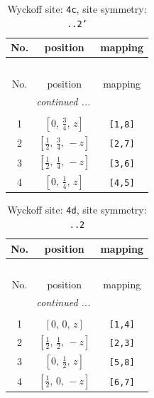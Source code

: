 \documentclass[fleqn,8pt]{jsarticle}
\begin{document}
\renewcommand{\arraystretch}{1.2}
\begin{longtable}{ccc}
\caption{Wyckoff site: {\tt 4c}, site symmetry: {\tt ..2'}}
 \\
 \hline \hline
No. & position & mapping \\ \hline \endfirsthead

\multicolumn{2}{l}{\tablename\ \thetable{}} \\
 \hline \hline
No. & position & mapping \\ \hline \endhead

 \hline \hline
\multicolumn{2}{r}{\footnotesize\it continued ...} \\ \endfoot

 \hline \hline
\multicolumn{2}{r}{} \\ \endlastfoot

1 & $\left[ 0,\, \frac{3}{4},\, z \right]$ & {\tt [1,8]} \\ \hline
2 & $\left[ \frac{1}{2},\, \frac{3}{4},\, - z \right]$ & {\tt [2,7]} \\ \hline
3 & $\left[ \frac{1}{2},\, \frac{1}{4},\, - z \right]$ & {\tt [3,6]} \\ \hline
4 & $\left[ 0,\, \frac{1}{4},\, z \right]$ & {\tt [4,5]} \\
\end{longtable}
\renewcommand{\arraystretch}{1.2}
\begin{longtable}{ccc}
\caption{Wyckoff site: {\tt 4d}, site symmetry: {\tt ..2}}
 \\
 \hline \hline
No. & position & mapping \\ \hline \endfirsthead

\multicolumn{2}{l}{\tablename\ \thetable{}} \\
 \hline \hline
No. & position & mapping \\ \hline \endhead

 \hline \hline
\multicolumn{2}{r}{\footnotesize\it continued ...} \\ \endfoot

 \hline \hline
\multicolumn{2}{r}{} \\ \endlastfoot

1 & $\left[ 0,\, 0,\, z \right]$ & {\tt [1,4]} \\ \hline
2 & $\left[ \frac{1}{2},\, \frac{1}{2},\, - z \right]$ & {\tt [2,3]} \\ \hline
3 & $\left[ 0,\, \frac{1}{2},\, z \right]$ & {\tt [5,8]} \\ \hline
4 & $\left[ \frac{1}{2},\, 0,\, - z \right]$ & {\tt [6,7]} \\
\end{longtable}
\end{document}
